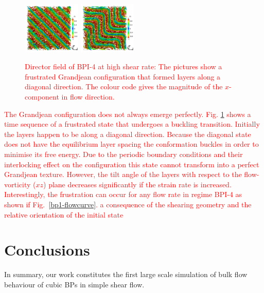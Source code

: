\documentclass[8.5pt,twoside,twocolumn]{article}
\newcommand{\rev}[1]{{\textcolor{red}{#1}}}
\begin{document}
\begin{figure}[htpb]
\includegraphics[width=0.245\textwidth]{dir3d+y-450k_run916r.png}\nolinebreak
\includegraphics[width=0.245\textwidth]{dir3d+y-800k_run916r.png}
\caption{
\rev{Director field of BPI-4 at high shear rate: The pictures show a frustrated 
Grandjean configuration that formed layers along a diagonal direction. 
The colour code gives the magnitude of the $x$-component in flow direction. 
}
}
\label{bp1-4-frust}
\end{figure}


\rev{The Grandjean configuration does not always emerge perfectly.
Fig. \ref{bp1-4-frust} shows a time sequence of a frustrated state 
that undergoes a buckling transition.
Initially the layers happen to be along a diagonal direction. 
Because the diagonal state does not have the equilibrium layer spacing the conformation 
buckles in order to minimise its free energy.
Due to the periodic boundary conditions and their interlocking effect on the configuration 
this state cannot transform into a perfect Grandjean texture. However, the tilt angle of the
layers with respect to the flow-vorticity ($xz$) plane decreases significantly if the 
strain rate is increased.
Interestingly, the frustration can occur for any flow rate in regime BPI-4 as shown if Fig.~\ref{bp1-flowcurve}.
 a consequence of the shearing geometry and the relative orientation of the initial state
}


\section{Conclusions}

In summary, our work constitutes the first large scale simulation of bulk flow behaviour 
of cubic BPs in simple shear flow. 
  
\end{document}
